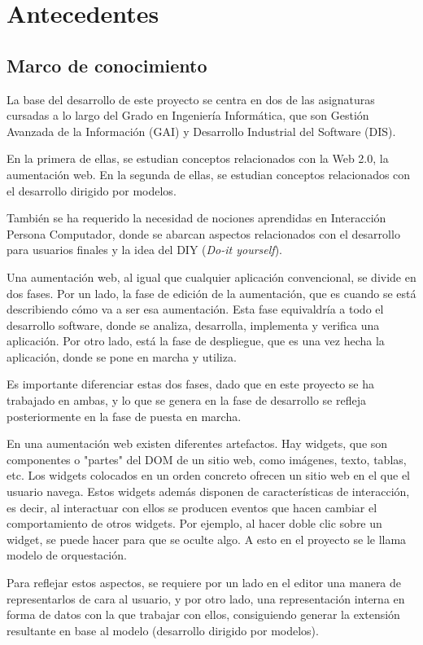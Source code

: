\chapter{Antecedentes}
\label{cha:Antecedentes}


\section{Marco de conocimiento}

La base del desarrollo de este proyecto se centra en dos de las asignaturas cursadas a lo largo del Grado en Ingeniería Informática, que son Gestión Avanzada de la Información (GAI) y Desarrollo Industrial del Software (DIS).

En la primera de ellas, se estudian conceptos relacionados con la Web 2.0, la aumentación web. En la segunda de ellas, se estudian conceptos relacionados con el desarrollo dirigido por modelos.

También se ha requerido la necesidad de nociones aprendidas en Interacción Persona Computador, donde se abarcan aspectos relacionados con el desarrollo para usuarios finales y la idea del DIY (\emph{Do-it yourself}).

Una aumentación web, al igual que cualquier aplicación convencional, se divide en dos fases. Por un lado, la fase de edición de la aumentación, que es cuando se está describiendo cómo va a ser esa aumentación. Esta fase equivaldría a todo el desarrollo software, donde se analiza, desarrolla, implementa y verifica una aplicación. Por otro lado, está la fase de despliegue, que es una vez hecha la aplicación, donde se pone en marcha y utiliza.

Es importante diferenciar estas dos fases, dado que en este proyecto se ha trabajado en ambas, y lo que se genera en la fase de desarrollo se refleja posteriormente en la fase de puesta en marcha.

En una aumentación web existen diferentes artefactos. Hay widgets, que son componentes o "partes" del DOM de un sitio web, como imágenes, texto, tablas, etc. Los widgets colocados en un orden concreto ofrecen un sitio web en el que el usuario navega. Estos widgets además disponen de características de interacción, es decir, al interactuar con ellos se producen eventos que hacen cambiar el comportamiento de otros widgets. Por ejemplo, al hacer doble clic sobre un widget, se puede hacer para que se oculte algo. A esto en el proyecto se le llama modelo de orquestación.

Para reflejar estos aspectos, se requiere por un lado en el editor una manera de representarlos de cara al usuario, y por otro lado, una representación interna en forma de datos con la que trabajar con ellos, consiguiendo generar la extensión resultante en base al modelo (desarrollo dirigido por modelos).

